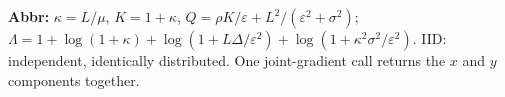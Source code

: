 \begin{table}[tp]
\begin{threeparttable}
\begin{tablenotes}[flushleft]\footnotesize
\item[] \textbf{Abbr:} $\kappa=L/\mu$, $K=1+\kappa$, $Q=\rho K/\varepsilon+L^2/(\varepsilon^2+\sigma^2)$;
$\Lambda=1+\log(1+\kappa)+\log(1+L\Delta/\varepsilon^2)+\log(1+\kappa^2\sigma^2/\varepsilon^2)$.
IID: independent, identically distributed. One joint-gradient call returns the $x$ and $y$ components together.
\end{tablenotes}
\end{threeparttable}
\end{table}
\clearpage
